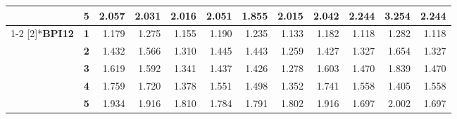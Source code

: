 \begin{table}[htbp]
{\begin{tabular}{|cl|rrrrrrrrrr|}
          & \textbf{5} & \cellcolor[rgb]{ .796,  .796,  .796}2.057 & \cellcolor[rgb]{ .8,  .8,  .8}2.031 & \cellcolor[rgb]{ .8,  .8,  .8}2.016 & \cellcolor[rgb]{ .796,  .796,  .796}2.051 & \cellcolor[rgb]{ .82,  .82,  .82}1.855 & \cellcolor[rgb]{ .804,  .804,  .804}2.015 & \cellcolor[rgb]{ .8,  .8,  .8}2.042 & \cellcolor[rgb]{ .776,  .776,  .776}2.244 & \cellcolor[rgb]{ .659,  .659,  .659}3.254 & \cellcolor[rgb]{ .776,  .776,  .776}2.244 \\
\cmidrule{1-2}    \multirow{5}[2]{*}{\textbf{BPI12}} & \textbf{1} & \cellcolor[rgb]{ .839,  .839,  .839}1.179 & \cellcolor[rgb]{ .816,  .816,  .816}1.275 & \cellcolor[rgb]{ .843,  .843,  .843}1.155 & \cellcolor[rgb]{ .835,  .835,  .835}1.190 & \cellcolor[rgb]{ .827,  .827,  .827}1.235 & \cellcolor[rgb]{ .851,  .851,  .851}1.133 & \cellcolor[rgb]{ .839,  .839,  .839}1.182 & \cellcolor[rgb]{ .851,  .851,  .851}1.118 & \cellcolor[rgb]{ .816,  .816,  .816}1.282 & \cellcolor[rgb]{ .851,  .851,  .851}1.118 \\
          & \textbf{2} & \cellcolor[rgb]{ .78,  .78,  .78}1.432 & \cellcolor[rgb]{ .753,  .753,  .753}1.566 & \cellcolor[rgb]{ .808,  .808,  .808}1.310 & \cellcolor[rgb]{ .78,  .78,  .78}1.445 & \cellcolor[rgb]{ .78,  .78,  .78}1.443 & \cellcolor[rgb]{ .82,  .82,  .82}1.259 & \cellcolor[rgb]{ .784,  .784,  .784}1.427 & \cellcolor[rgb]{ .804,  .804,  .804}1.327 & \cellcolor[rgb]{ .733,  .733,  .733}1.654 & \cellcolor[rgb]{ .804,  .804,  .804}1.327 \\
          & \textbf{3} & \cellcolor[rgb]{ .741,  .741,  .741}1.619 & \cellcolor[rgb]{ .745,  .745,  .745}1.592 & \cellcolor[rgb]{ .804,  .804,  .804}1.341 & \cellcolor[rgb]{ .78,  .78,  .78}1.437 & \cellcolor[rgb]{ .784,  .784,  .784}1.426 & \cellcolor[rgb]{ .816,  .816,  .816}1.278 & \cellcolor[rgb]{ .745,  .745,  .745}1.603 & \cellcolor[rgb]{ .773,  .773,  .773}1.470 & \cellcolor[rgb]{ .69,  .69,  .69}1.839 & \cellcolor[rgb]{ .773,  .773,  .773}1.470 \\
          & \textbf{4} & \cellcolor[rgb]{ .71,  .71,  .71}1.759 & \cellcolor[rgb]{ .718,  .718,  .718}1.720 & \cellcolor[rgb]{ .792,  .792,  .792}1.378 & \cellcolor[rgb]{ .757,  .757,  .757}1.551 & \cellcolor[rgb]{ .769,  .769,  .769}1.498 & \cellcolor[rgb]{ .8,  .8,  .8}1.352 & \cellcolor[rgb]{ .714,  .714,  .714}1.741 & \cellcolor[rgb]{ .753,  .753,  .753}1.558 & \cellcolor[rgb]{ .788,  .788,  .788}1.405 & \cellcolor[rgb]{ .753,  .753,  .753}1.558 \\
          & \textbf{5} & \cellcolor[rgb]{ .667,  .667,  .667}1.934 & \cellcolor[rgb]{ .675,  .675,  .675}1.916 & \cellcolor[rgb]{ .698,  .698,  .698}1.810 & \cellcolor[rgb]{ .702,  .702,  .702}1.784 & \cellcolor[rgb]{ .702,  .702,  .702}1.791 & \cellcolor[rgb]{ .698,  .698,  .698}1.802 & \cellcolor[rgb]{ .671,  .671,  .671}1.916 & \cellcolor[rgb]{ .722,  .722,  .722}1.697 & \cellcolor[rgb]{ .651,  .651,  .651}2.002 & \cellcolor[rgb]{ .722,  .722,  .722}1.697 \\

\end{tabular}}
\end{table}
